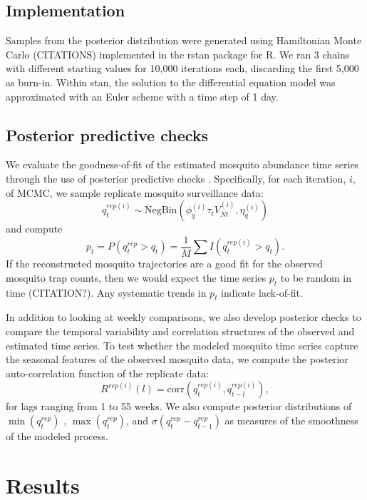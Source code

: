 \documentclass[10pt,letterpaper]{article}
\begin{document}
\subsection*{Implementation}
 
Samples from the posterior distribution were generated using Hamiltonian Monte Carlo (CITATIONS) implemented in the rstan package for R. 
We ran 3 chains with different starting values for 10,000 iterations each, discarding the first 5,000 as burn-in.
Within stan, the solution to the differential equation model was approximated with an Euler scheme with a time step of 1 day.  

\subsection*{Posterior predictive checks}

We evaluate the goodness-of-fit of the estimated mosquito abundance time series through the use of posterior predictive checks \cite{Gelman1996,Gelman2003}.
Specifically, for each iteration, $i$, of MCMC, we sample replicate mosquito surveillance data:
\begin{equation}
q^{rep(i)}_t \sim \text{NegBin}(\phi^{(i)}_q \tau_t V^{(i)}_{Nt}, \eta^{(i)}_q)
\end{equation}
and compute
\begin{equation}
p_t = P(q^{rep}_t > q_t) = \frac{1}{M}\sum I(q^{rep(i)}_t > q_t).
\end{equation}
If the reconstructed mosquito trajectories are a good fit for the observed mosquito trap counts, then we would expect the time series $p_t$ to be random in time (CITATION?).
Any systematic trends in $p_t$ indicate lack-of-fit.

In addition to looking at weekly comparisons, we also develop posterior checks to compare the temporal variability and correlation structures of the observed and estimated time series.
To test whether the modeled mosquito time series capture the seasonal features of the observed mosquito data, we compute the posterior auto-correlation function of the replicate data:
\begin{equation}
R^{rep(i)}(l) = \text{corr}(q^{rep(i)}_t, q^{rep(i)}_{t-l}),
\end{equation}
for lags ranging from 1 to 55 weeks.
We also compute posterior distributions of $\min(q^{rep}_t)$ , $\max(q^{rep}_t)$, and $\sigma(q^{rep}_t - q^{rep}_{t-1})$ as measures of the smoothness of the modeled process.

\section*{Results}
\end{document}
